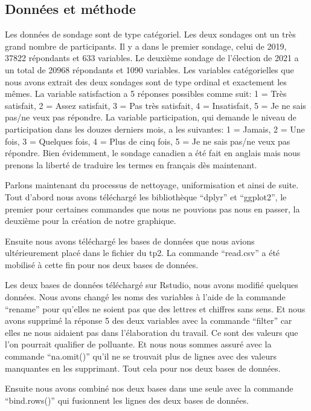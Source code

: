 \documentclass[
  letterpaper,
  DIV=11,
  numbers=noendperiod]{scrartcl}
\begin{document}
\hypertarget{donnuxe9es-et-muxe9thode}{%
\subsection{Données et méthode}\label{donnuxe9es-et-muxe9thode}}

Les données de sondage sont de type catégoriel. Les deux sondages ont un
très grand nombre de participants. Il y a dans le premier sondage, celui
de 2019, 37822 répondants et 633 variables. Le deuxième sondage de
l'élection de 2021 a un total de 20968 répondants et 1090 variables. Les
variables catégorielles que nous avons extrait des deux sondages sont de
type ordinal et exactement les mêmes. La variable satisfaction a 5
réponses possibles comme suit: 1 = Très satisfait, 2 = Assez satisfait,
3 = Pas très satisfait, 4 = Insatisfait, 5 = Je ne sais pas/ne veux pas
répondre. La variable participation, qui demande le niveau de
participation dans les douzes derniers mois, a les suivantes: 1 =
Jamais, 2 = Une fois, 3 = Quelques fois, 4 = Plus de cinq fois, 5 = Je
ne sais pas/ne veux pas répondre. Bien évidemment, le sondage canadien a
été fait en anglais mais nous prenons la liberté de traduire les termes
en français dès maintenant.

Parlons maintenant du processus de nettoyage, uniformisation et ainsi de
suite. Tout d'abord nous avons téléchargé les bibliothèque ``dplyr'' et
``ggplot2'', le premier pour certaines commandes que nous ne pouvions
pas nous en passer, la deuxième pour la création de notre graphique.

Ensuite nous avons téléchargé les bases de données que nous avions
ultérieurement placé dans le fichier du tp2. La commande ``read.csv'' a
été mobilisé à cette fin pour nos deux bases de données.

Les deux bases de données téléchargé sur Rstudio, nous avons modifié
quelques données. Nous avons changé les noms des variables à l'aide de
la commande ``rename'' pour qu'elles ne soient pas que des lettres et
chiffres sans sens. Et nous avons supprimé la réponse 5 des deux
variables avec la commande ``filter'' car elles ne nous aidaient pas
dans l'élaboration du travail. Ce sont des valeurs que l'on pourrait
qualifier de polluante. Et nous nous sommes assuré avec la commande
``na.omit()'' qu'il ne se trouvait plus de lignes avec des valeurs
manquantes en les supprimant. Tout cela pour nos deux bases de données.

Ensuite nous avons combiné nos deux bases dans une seule avec la
commande ``bind.rows()'' qui fusionnent les lignes des deux bases de
données.
\end{document}
